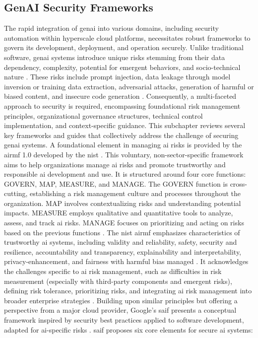 \subsection{GenAI Security Frameworks}
\label{sec:GenAI Security Frameworks}

The rapid integration of \gls{genai} into various domains, including security automation within \gls{hyperscale} cloud platforms, necessitates robust frameworks to govern its development, deployment, and operation securely. Unlike traditional software, \gls{genai} systems introduce unique risks stemming from their data dependency, complexity, potential for emergent behaviors, and socio-technical nature \cite{tabassi_artificial_2023}. These risks include prompt injection, data leakage through model inversion or training data extraction, adversarial attacks, generation of harmful or biased content, and insecure code generation \cite{haryanto_secgenai_2024, hansen_introducing_2023}. Consequently, a multi-faceted approach to security is required, encompassing foundational risk management principles, organizational governance structures, technical control implementation, and context-specific guidance. This subchapter reviews several key frameworks and guides that collectively address the challenge of securing \gls{genai} systems.
A foundational element in managing \gls{ai} risks is provided by the \gls{airmf} 1.0 developed by the \gls{nist} \cite{tabassi_artificial_2023}. This voluntary, non-sector-specific framework aims to help organizations manage \gls{ai} risks and promote trustworthy and responsible \gls{ai} development and use. It is structured around four core functions: GOVERN, MAP, MEASURE, and MANAGE. The GOVERN function is cross-cutting, establishing a risk management culture and processes throughout the organization. MAP involves contextualizing risks and understanding potential impacts. MEASURE employs qualitative and quantitative tools to analyze, assess, and track \gls{ai} risks. MANAGE focuses on prioritizing and acting on risks based on the previous functions \cite{tabassi_artificial_2023}. The \gls{nist} \gls{airmf} emphasizes characteristics of trustworthy \gls{ai} systems, including validity and reliability, safety, security and resilience, accountability and transparency, explainability and interpretability, privacy-enhancement, and fairness with harmful bias managed \cite{tabassi_artificial_2023}. It acknowledges the challenges specific to \gls{ai} risk management, such as difficulties in risk measurement (especially with third-party components and emergent risks), defining risk tolerance, prioritizing risks, and integrating \gls{ai} risk management into broader enterprise strategies \cite{tabassi_artificial_2023}.
Building upon similar principles but offering a perspective from a major cloud provider, Google's \gls{saif} presents a conceptual framework inspired by security best practices applied to software development, adapted for \gls{ai}-specific risks \cite{hansen_introducing_2023}. \gls{saif} proposes six core elements for secure \gls{ai} systems\cite{hansen_introducing_2023}:

